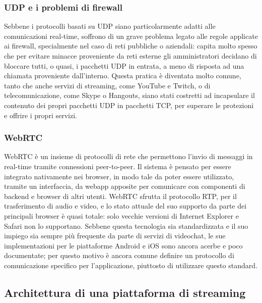 			\subsubsection{UDP e i problemi di firewall}
			Sebbene i protocolli basati su UDP siano particolarmente adatti alle comunicazioni real-time, soffrono di un grave problema legato alle regole applicate ai firewall, specialmente nel caso di reti pubbliche o aziendali: capita molto spesso che per evitare minacce proveniente da reti esterne gli amministratori decidano di bloccare tutti, o quasi, i pacchetti UDP in entrata, a meno di risposta ad una chiamata proveniente dall'interno. Questa pratica è diventata molto comune, tanto che anche servizi di streaming, come YouTube e Twitch, o di telecomunicazione, come Skype o Hangouts, siano stati costretti ad incapsulare il contenuto dei propri pacchetti UDP in pacchetti TCP, per superare le protezioni e offrire i propri servizi.

			\subsubsection{WebRTC}
			WebRTC è un insieme di protocolli di rete che permettono l'invio di messaggi in real-time tramite connessioni peer-to-peer. Il sistema è pensato per essere integrato nativamente nei browser, in modo tale da poter essere utilizzato, tramite un interfaccia, da webapp apposite per comunicare con componenti di backend e browser di altri utenti. WebRTC sfrutta il protocollo RTP, per il trasferimento di audio e video, e lo stato attuale del suo supporto da parte dei principali browser è quasi totale: solo vecchie versioni di Internet Explorer e Safari non lo supportano. Sebbene questa tecnologia sia standardizzata e il suo impiego sia sempre più frequente da parte di servizi di videochat, le sue implementazioni per le piattaforme Android e iOS sono ancora acerbe e poco documentate; per questo motivo è ancora comune definire un protocollo di comunicazione specifico per l'applicazione, piuttosto di utilizzare questo standard.

	 \subsection{Architettura di una piattaforma di streaming}
